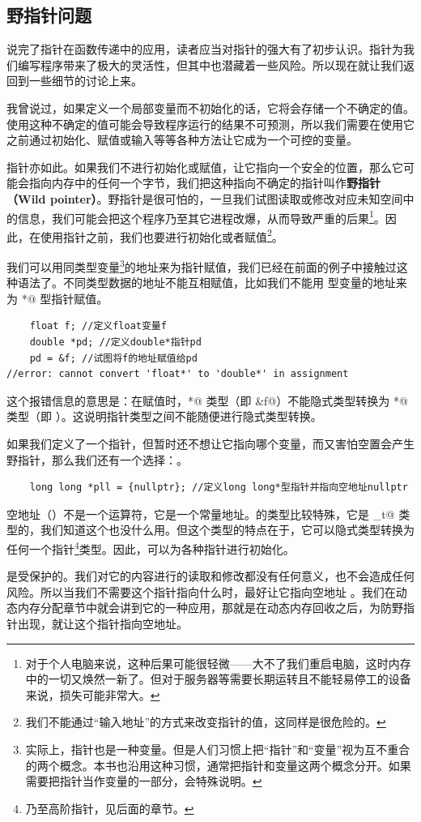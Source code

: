 \subsection*{野指针问题}
说完了指针在函数传递中的应用，读者应当对指针的强大有了初步认识。指针为我们编写程序带来了极大的灵活性，但其中也潜藏着一些风险。所以现在就让我们返回到一些细节的讨论上来。\par
我曾说过，如果定义一个局部变量而不初始化的话，它将会存储一个不确定的值。使用这种不确定的值可能会导致程序运行的结果不可预测，所以我们需要在使用它之前通过初始化、赋值或输入等等各种方法让它成为一个可控的变量。\par
指针亦如此。如果我们不进行初始化或赋值，让它指向一个安全的位置，那么它可能会指向内存中的任何一个字节，我们把这种指向不确定的指针叫作\textbf{野指针（Wild pointer）}。野指针是很可怕的，一旦我们试图读取或修改对应未知空间中的信息，我们可能会把这个程序乃至其它进程改爆，从而导致严重的后果\footnote{对于个人电脑来说，这种后果可能很轻微——大不了我们重启电脑，这时内存中的一切又焕然一新了。但对于服务器等需要长期运转且不能轻易停工的设备来说，损失可能非常大。}。因此，在使用指针之前，我们也要进行初始化或者赋值\footnote{我们不能通过``输入地址''的方式来改变指针的值，这同样是很危险的。}。\par
我们可以用同类型变量\footnote{实际上，指针也是一种变量。但是人们习惯上把``指针''和``变量''视为互不重合的两个概念。本书也沿用这种习惯，通常把指针和变量这两个概念分开。如果需要把指针当作变量的一部分，会特殊说明。}的地址来为指针赋值，我们已经在前面的例子中接触过这种语法了。不同类型数据的地址不能互相赋值，比如我们不能用 \lstinline@float@ 型变量的地址来为 \lstinline@double*@ 型指针赋值。\par
\begin{lstlisting}
    float f; //定义float变量f
    double *pd; //定义double*指针pd
    pd = &f; //试图将f的地址赋值给pd
//error: cannot convert 'float*' to 'double*' in assignment
\end{lstlisting}
这个报错信息的意思是：在赋值时，\lstinline@float*@ 类型（即 \lstinline@&f@）不能隐式类型转换为 \lstinline@double*@ 类型（即 \lstinline@pd@）。这说明指针类型之间不能随便进行隐式类型转换。\par
如果我们定义了一个指针，但暂时还不想让它指向哪个变量，而又害怕空置会产生野指针，那么我们还有一个选择：\lstinline@nullptr@。
\begin{lstlisting}
    long long *pll = {nullptr}; //定义long long*型指针并指向空地址nullptr
\end{lstlisting}
空地址（\lstinline@nullptr@）不是一个运算符，它是一个常量地址。\lstinline@nullptr@ 的类型比较特殊，它是 \lstinline@nullptr_t@ 类型的，我们知道这个也没什么用。但这个类型的特点在于，它可以隐式类型转换为任何一个指针\footnote{乃至高阶指针，见后面的章节。}类型。因此，\lstinline@nullptr@ 可以为各种指针进行初始化。\par
\lstinline@nullptr@ 是受保护的。我们对它的内容进行的读取和修改都没有任何意义，也不会造成任何风险。所以当我们不需要这个指针指向什么时，最好让它指向空地址 \lstinline@nullptr@。我们在动态内存分配章节中就会讲到它的一种应用，那就是在动态内存回收之后，为防野指针出现，就让这个指针指向空地址。\par
